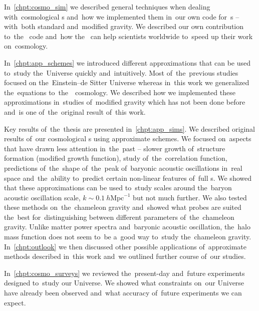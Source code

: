 In~\autoref{chpt:cosmo_sim} we described general techniques when dealing with~cosmological \nbodysim s and~how we implemented them in~our own code for~\nbodysim s -- with~both standard and~modified gravity. We described our own contribution to~the~ code and~how the~ can help scientists worldwide to~speed up their work on~cosmology.

In~\autoref{chpt:app_schemes} we introduced different approximations that can be used to~study the~Universe quickly and~intuitively. Most of~the~previous studies focused on the~Einstein--de Sitter Universe whereas in~this work we generalized the~equations to~the~\LCDM\ cosmology. We described how we implemented these approximations in~studies of~modified gravity which has not been done before and~is one of~the~original result of~this work.

Key results of~the~thesis are presented in~\autoref{chpt:app_sims}. We described original results of~our cosmological \nbodysim s using approximate schemes. We focused on~aspects that have drawn less attention in~the~past -- slower growth of~structure formation (modified growth function), study of~the~correlation function, predictions of~the~shape of~the~peak of~baryonic acoustic oscillations in~real space and~the~ability to~predict certain non-linear features of~full \nbodysim s. We showed that these approximations can be used to~study scales around the~baryon acoustic oscillation scale, $k\sim 0.1~h\text{Mpc}^{-1}$ but not much further. We also tested these methods on~the~chameleon gravity and~showed what probes are suited the~best for~distinguishing between different parameters of~the~chameleon gravity. Unlike matter power spectra and~baryonic acoustic oscillation, the~halo mass function does not seem to~be a~good way to~study the~chameleon gravity. In~\autoref{chpt:outlook} we then discussed other possible applications of~approximate methods described in~this work and~we outlined further course of~our studies.

In~\autoref{chpt:cosmo_surveys} we reviewed the~present-day and~future experiments designed to~study our Universe. We showed what constraints on~our Universe have already been observed and~what accuracy of~future experiments we can expect.

